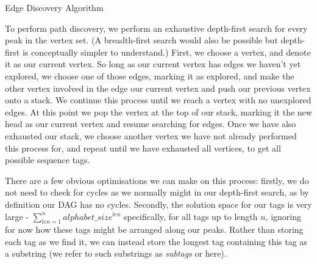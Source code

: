\documentclass{l4proj}
\begin{document}
\begin{algorithm}
    \DontPrintSemicolon

\caption{Edge Discovery Algorithm}\label{alg:edgedesc}
\end{algorithm}

To perform path discovery, we perform an exhaustive depth-first search for every peak in the vertex set. (A breadth-first search would also be possible but depth-first is conceptually simpler to understand.) First, we choose a vertex, and denote it as our current vertex. So long as our current vertex has edges we haven't yet explored, we choose one of those edges, marking it as explored, and make the other vertex involved in the edge our current vertex and push our previous vertex onto a stack. We continue this process until we reach a vertex with no unexplored edges. At this point we pop the vertex at the top of our stack, marking it the new head as our current vertex and resume searching for edges. Once we have also exhausted our stack, we choose another vertex we have not already performed this process for, and repeat until we have exhausted all vertices, to get all possible sequence tags.

There are a few obvious optimisations we can make on this process: firstly, we do not need to check for cycles as we normally might in our depth-first search, as by definition our DAG has no cycles. Secondly, the solution space for our tags is very large - \(\sum_{len=1}^{n}{alphabet\_size^{len}}\) specifically, for all tags up to length \(n\), ignoring for now how these tags might be arranged along our peaks. Rather than storing each tag as we find it, we can instead store the longest tag containing this tag as a substring (we refer to such substrings as \textit{subtags} or here). 
\end{document}
